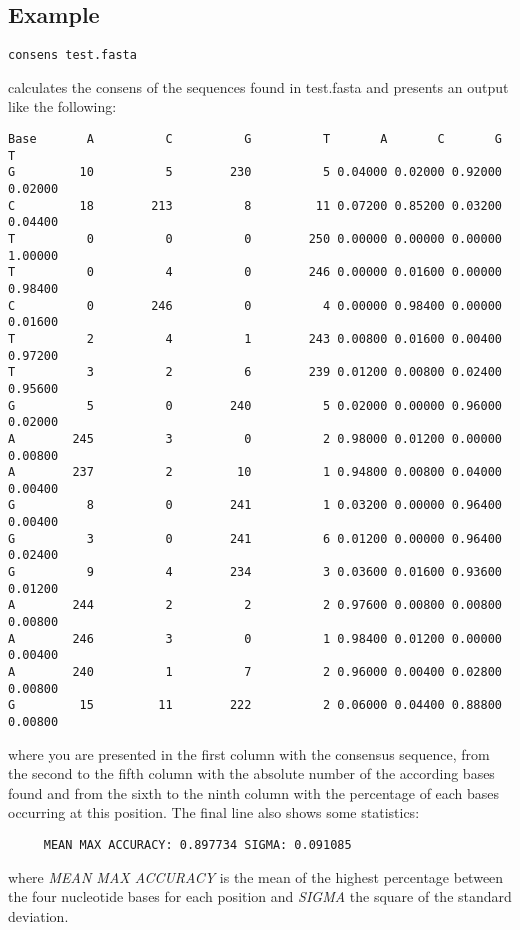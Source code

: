 \subsection{Example}
\begin{lstlisting}
consens test.fasta
\end{lstlisting}
calculates the consens of the sequences found in test.fasta and
presents an output like the following:
\begin{lstlisting}
Base       A          C          G          T       A       C       G       T
G         10          5        230          5 0.04000 0.02000 0.92000 0.02000
C         18        213          8         11 0.07200 0.85200 0.03200 0.04400
T          0          0          0        250 0.00000 0.00000 0.00000 1.00000
T          0          4          0        246 0.00000 0.01600 0.00000 0.98400
C          0        246          0          4 0.00000 0.98400 0.00000 0.01600
T          2          4          1        243 0.00800 0.01600 0.00400 0.97200
T          3          2          6        239 0.01200 0.00800 0.02400 0.95600
G          5          0        240          5 0.02000 0.00000 0.96000 0.02000
A        245          3          0          2 0.98000 0.01200 0.00000 0.00800
A        237          2         10          1 0.94800 0.00800 0.04000 0.00400
G          8          0        241          1 0.03200 0.00000 0.96400 0.00400
G          3          0        241          6 0.01200 0.00000 0.96400 0.02400
G          9          4        234          3 0.03600 0.01600 0.93600 0.01200
A        244          2          2          2 0.97600 0.00800 0.00800 0.00800
A        246          3          0          1 0.98400 0.01200 0.00000 0.00400
A        240          1          7          2 0.96000 0.00400 0.02800 0.00800
G         15         11        222          2 0.06000 0.04400 0.88800 0.00800
\end{lstlisting}
where you are presented in the first column with the consensus
sequence, from the second to the fifth column with the absolute number
of the according bases found and from the sixth to the ninth column
with the percentage of each bases occurring at this position.
The final line also shows some statistics:
\begin{lstlisting}
     MEAN MAX ACCURACY: 0.897734 SIGMA: 0.091085
\end{lstlisting}
where \emph{MEAN MAX ACCURACY} is the mean of the highest percentage
between the four nucleotide bases for each position and \emph{SIGMA} the
square of the standard deviation.


